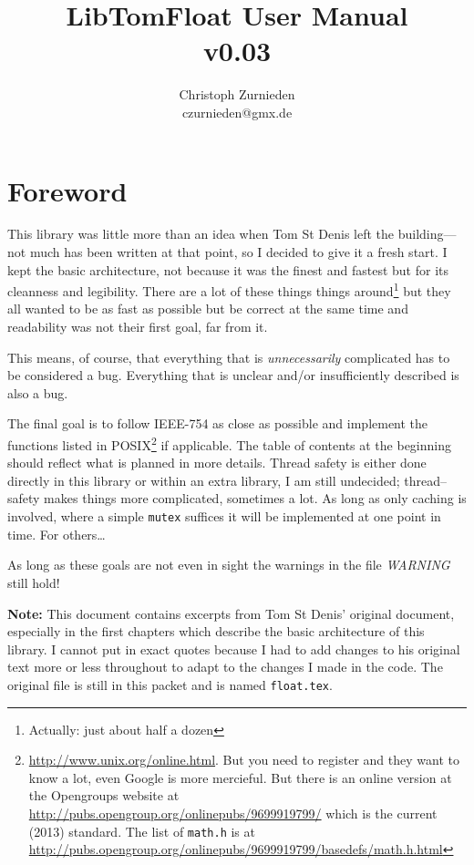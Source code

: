 \documentclass[a4paper]{book}
\theoremstyle{definition}
\theoremstyle{remark}
\begin{document}
\frontmatter
\pagestyle{empty}
\title{LibTomFloat User Manual \\ v0.03}
\author{Christoph Zurnieden \\ czurnieden@gmx.de}
\maketitle

\tableofcontents
\listoffigures
\mainmatter
\pagestyle{headings}
\chapter*{Foreword}
This library was little more than an idea when Tom St Denis left the building---not much has been written at that point, so I decided to give it a fresh start. I kept the basic architecture, not because it was the finest and fastest but for its cleanness and legibility. There are a lot of these things things around\footnote{Actually: just about half a dozen} but they all wanted to be as fast as possible but be correct at the same time and readability was not their first goal, far from it.

This means, of course, that everything that is {\emph{unnecessarily}} complicated has to be considered a bug. Everything that is unclear and/or insufficiently described is also a bug.

The final goal is to follow IEEE-754 as close as possible and implement the functions listed in POSIX\footnote{\url{http://www.unix.org/online.html}. But you need to register and they want to know a lot, even Google is more mercieful. But there is an online version at the Opengroups website at \url{http://pubs.opengroup.org/onlinepubs/9699919799/} which is the current (2013) standard. The list of {\texttt{math.h}} is at \url{http://pubs.opengroup.org/onlinepubs/9699919799/basedefs/math.h.html}} if applicable. The table of contents at the beginning should reflect what is planned in more details. Thread safety is either done directly in this library or within an extra library, I am still undecided; thread--safety makes things more complicated, sometimes a lot. As long as only caching is involved, where a simple {\texttt{mutex}} suffices it will be implemented at one point in time. For others\ldots

As long as these goals are not even in sight the warnings in the file \textit{WARNING} still hold!

{\textbf{Note: }}This document contains excerpts from Tom St Denis' original document, especially in the first chapters which describe the basic architecture of this library. I cannot put in exact quotes because I had to add changes to his original text more or less throughout to adapt to the changes I made in the code. The original file is still in this packet and is named {\texttt{float.tex}}.
\end{document}
